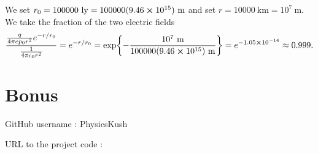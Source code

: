 \documentclass[
	12pt,
	]{article}
\newcommand{\ep}{\epsilon}
\theoremstyle{definition}
\theoremstyle{definition}
\theoremstyle{definition}
\theoremstyle{definition}
\theoremstyle{definition}
\theoremstyle{example}
\theoremstyle{note}
\theoremstyle{remark}
\theoremstyle{example}
\begin{document}
					\noindent We set $r_{0} = 100 000 \ \text{ly} = 100 000(9.46\cross 10^{15}) \ \si{\meter}$ and set $r = 10 000 \ \si{\kilo\meter} = 10^{7} \ \si{\meter}$. We take the fraction of the two electric fields 
					$$ \frac{\frac{q}{4\pi ep_{0}r^{2}}e^{-r/r_{0}}}{\frac{1}{4\pi \ep_{0}r^{2}}}= e^{-r/r_{0}} = \exp{-\frac{10^{7} \ \si{\meter}}{100 000(9.46\cross 10^{15}) \ \si{\meter}}} = e^{-1.05\cross 10^{-14}} \approx 0.999.$$ 
				\section*{Bonus} 
					GitHub username : PhysicsKush 
					
					URL to the project code : 
					
	
\end{document}
